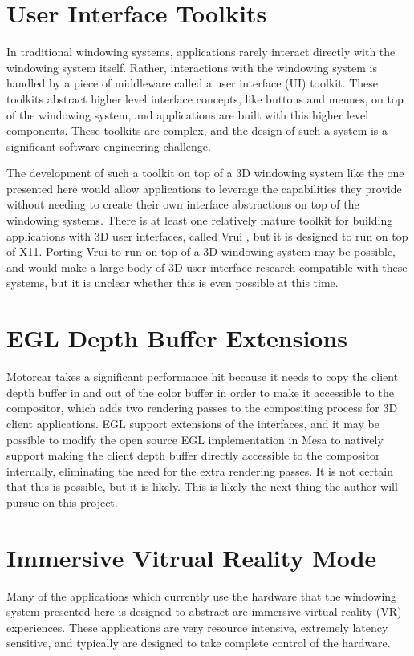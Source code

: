 \section{User Interface Toolkits}

In traditional windowing systems, applications rarely interact directly with the windowing system itself. Rather, interactions with the windowing system is handled by a piece of middleware called a user interface (UI) toolkit. These toolkits abstract higher level interface concepts, like buttons and menues, on top of the windowing system, and applications are built with this higher level components. These toolkits are complex, and the design of such a system is a significant software engineering challenge. 

The development of such a toolkit on top of a 3D windowing system like the one presented here  would allow applications to leverage the capabilities they provide without needing to create their own interface abstractions on top of the windowing systems. There is at least one relatively mature toolkit for building applications with 3D user interfaces, called Vrui \cite{vrui}, but it is designed to run on top of X11. Porting Vrui to run on top of a 3D windowing system may be possible, and would make a large body of 3D user interface research compatible with these systems, but it is unclear whether this is even possible at this time.

\section{EGL Depth Buffer Extensions} 
Motorcar takes a significant performance hit because it needs to copy the client depth buffer in and out of the color buffer in order to make it accessible to the compositor, which adds two rendering passes to the compositing process for 3D client applications. EGL support extensions of the interfaces, and it may be possible to modify the open source EGL implementation in Mesa to natively support making the client depth buffer directly accessible to the compositor internally, eliminating the need for the extra rendering passes. It is not certain that this is possible, but it is likely. This is likely the next thing the author will pursue on this project.

\section{Immersive Vitrual Reality Mode}
\label{sec:vr-mode}
Many of the applications which currently use the hardware that the windowing system presented here is designed to abstract are immersive virtual reality (VR) experiences. These applications are very resource intensive, extremely latency sensitive, and typically are designed to take complete control of the hardware.


